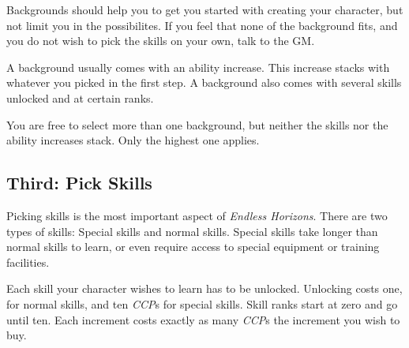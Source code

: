 Backgrounds should help you to get you started with creating your character, but
not limit you in the possibilites. If you feel that none of the background fits,
and you do not wish to pick the skills on your own, talk to the GM.

A background usually comes with an ability increase. This increase stacks with
whatever you picked in the first step. A background also comes with several
skills unlocked and at certain ranks.

You are free to select more than one background, but neither the skills nor the
ability increases stack. Only the highest one applies.

\subsection{Third: Pick Skills}

Picking skills is the most important aspect of \emph{Endless Horizons}. There
are two types of skills: Special skills and normal skills. Special skills take
longer than normal skills to learn, or even require access to special equipment
or training facilities.

Each skill your character wishes to learn has to be unlocked. Unlocking costs
one, for normal skills, and ten \emph{CCP}s for special skills. Skill ranks
start at zero and go until ten. Each increment costs exactly as many
\emph{CCP}s the increment you wish to buy.
